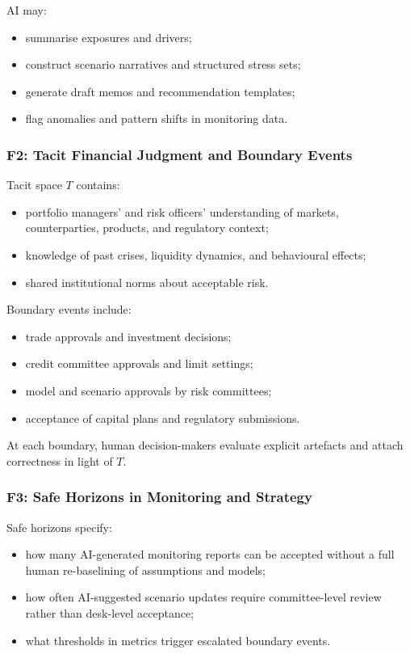 AI may:

\begin{itemize}
  \item summarise exposures and drivers;
  \item construct scenario narratives and structured stress sets;
  \item generate draft memos and recommendation templates;
  \item flag anomalies and pattern shifts in monitoring data.
\end{itemize}

\subsubsection*{F2: Tacit Financial Judgment and Boundary Events}

Tacit space $T$ contains:

\begin{itemize}
  \item portfolio managers' and risk officers' understanding of markets,
        counterparties, products, and regulatory context;
  \item knowledge of past crises, liquidity dynamics, and behavioural effects;
  \item shared institutional norms about acceptable risk.
\end{itemize}

Boundary events include:

\begin{itemize}
  \item trade approvals and investment decisions;
  \item credit committee approvals and limit settings;
  \item model and scenario approvals by risk committees;
  \item acceptance of capital plans and regulatory submissions.
\end{itemize}

At each boundary, human decision-makers evaluate explicit artefacts and
attach correctness in light of $T$.

\subsubsection*{F3: Safe Horizons in Monitoring and Strategy}

Safe horizons specify:

\begin{itemize}
  \item how many AI-generated monitoring reports can be accepted without
        a full human re-baselining of assumptions and models;
  \item how often AI-suggested scenario updates require committee-level
        review rather than desk-level acceptance;
  \item what thresholds in metrics trigger escalated boundary events.
\end{itemize}

